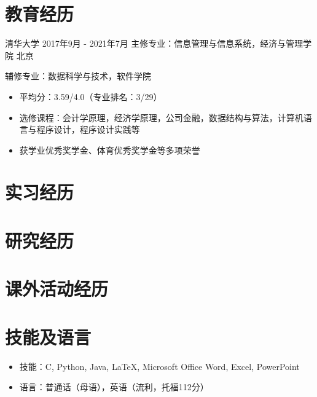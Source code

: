 \documentclass{resumeZH}
\begin{document}

\section{教育经历}
\Experience
{清华大学}
{2017年9月 - 2021年7月}
{主修专业：信息管理与信息系统，经济与管理学院}
{北京}

辅修专业：数据科学与技术，软件学院
\begin{itemize}
    \item 平均分：3.59/4.0（专业排名：3/29）
    \item 选修课程：会计学原理，经济学原理，公司金融，数据结构与算法，计算机语言与程序设计，程序设计实践等
    \item 获学业优秀奖学金、体育优秀奖学金等多项荣誉
\end{itemize}

\section{实习经历}

\summitview

\section{研究经历}

\fifaresearch

\section{课外活动经历}

\cydp

\tkd

\semtech

\section{技能及语言}
\vspace{0.618ex}
\begin{itemize}
    \item 技能：C, Python, Java, {\LaTeX}, Microsoft Office Word, Excel, PowerPoint
    \item 语言：普通话（母语），英语（流利，托福112分）
\end{itemize}
\end{document}
